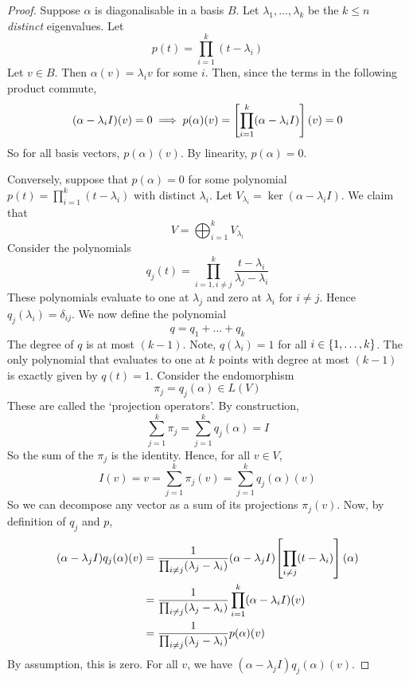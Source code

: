 \begin{proof}
	Suppose \( \alpha \) is diagonalisable in a basis \( B \).
	Let \( \lambda_1, \dots, \lambda_k \) be the \( k \leq n \) \textit{distinct} eigenvalues.
	Let
	\[
		p(t) = \prod_{i=1}^k (t-\lambda_i)
	\]
	Let \( v \in B \).
	Then \( \alpha(v) = \lambda_i v \) for some \( i \).
	Then, since the terms in the following product commute,
	\[
		(\alpha - \lambda_i I)(v) = 0 \implies p(\alpha)(v) = \qty[\prod_{i=1}^k (\alpha - \lambda_i I)](v) = 0
	\]
	So for all basis vectors, \( p(\alpha)(v) \).
	By linearity, \( p(\alpha) = 0 \).

	Conversely, suppose that \( p(\alpha) = 0 \) for some polynomial \( p(t) = \prod_{i=1}^k (t-\lambda_i) \) with distinct \( \lambda_i \).
	Let \( V_{\lambda_i} = \ker(\alpha - \lambda_i I) \).
	We claim that
	\[
		V = \bigoplus_{i=1}^k V_{\lambda_i}
	\]
	Consider the polynomials
	\[
		q_j(t) = \prod_{i=1,i \neq j}^k \frac{t-\lambda_i}{\lambda_j - \lambda_i}
	\]
	These polynomials evaluate to one at \( \lambda_j \) and zero at \( \lambda_i \) for \( i \neq j \).
	Hence \( q_j(\lambda_i) = \delta_{ij} \).
	We now define the polynomial
	\[
		q = q_1 + \dots + q_k
	\]
	The degree of \( q \) is at most \( (k-1) \).
	Note, \( q(\lambda_i) = 1 \) for all \( i \in \qty{1, \dots, k} \).
	The only polynomial that evaluates to one at \( k \) points with degree at most \( (k-1) \) is exactly given by \( q(t) = 1 \).
	Consider the endomorphism
	\[
		\pi_j = q_j(\alpha) \in L(V)
	\]
	These are called the `projection operators'.
	By construction,
	\[
		\sum_{j=1}^k \pi_j = \sum_{j=1}^k q_j(\alpha) = I
	\]
	So the sum of the \( \pi_j \) is the identity.
	Hence, for all \( v \in V \),
	\[
		I(v) = v = \sum_{j=1}^k \pi_j(v) = \sum_{j=1}^k q_j(\alpha)(v)
	\]
	So we can decompose any vector as a sum of its projections \( \pi_j(v) \).
	Now, by definition of \( q_j \) and \( p \),
	\begin{align*}
		(\alpha - \lambda_j I) q_j(\alpha)(v) & = \frac{1}{\prod_{i \neq j} (\lambda_j - \lambda_i)} (\alpha - \lambda_j I) \qty[\prod_{i \neq j} (t - \lambda_i)] (\alpha) \\
		                                      & = \frac{1}{\prod_{i \neq j} (\lambda_j - \lambda_i)} \prod_{i=1}^k (\alpha - \lambda_i I)(v)                                \\
		                                      & = \frac{1}{\prod_{i \neq j} (\lambda_j - \lambda_i)} p(\alpha)(v)
	\end{align*}
	By assumption, this is zero.
	For all \( v \), we have \( (\alpha - \lambda_j I) q_j(\alpha)(v) \).

\end{proof}
